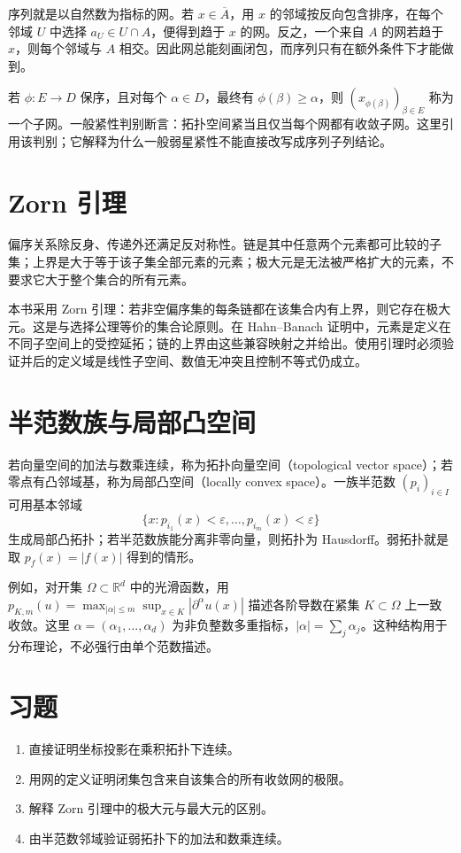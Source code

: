 \documentclass[UTF8,12pt,a4paper,fontset=fandol]{ctexbook}
\begin{document}
序列就是以自然数为指标的网。若 $x\in\overline A$，用 $x$ 的邻域按反向包含排序，在每个邻域 $U$ 中选择 $a_U\in U\cap A$，便得到趋于 $x$ 的网。反之，一个来自 $A$ 的网若趋于 $x$，则每个邻域与 $A$ 相交。因此网总能刻画闭包，而序列只有在额外条件下才能做到。

若 $\phi:E\to D$ 保序，且对每个 $\alpha\in D$，最终有 $\phi(\beta)\geq\alpha$，则 $(x_{\phi(\beta)})_{\beta\in E}$ 称为一个子网。一般紧性判别断言：拓扑空间紧当且仅当每个网都有收敛子网。这里引用该判别；它解释为什么一般弱星紧性不能直接改写成序列子列结论。

\section{Zorn 引理}
偏序关系除反身、传递外还满足反对称性。链是其中任意两个元素都可比较的子集；上界是大于等于该子集全部元素的元素；极大元是无法被严格扩大的元素，不要求它大于整个集合的所有元素。

本书采用 Zorn 引理：若非空偏序集的每条链都在该集合内有上界，则它存在极大元。这是与选择公理等价的集合论原则。在 Hahn--Banach 证明中，元素是定义在不同子空间上的受控延拓；链的上界由这些兼容映射之并给出。使用引理时必须验证并后的定义域是线性子空间、数值无冲突且控制不等式仍成立。

\section{半范数族与局部凸空间}
若向量空间的加法与数乘连续，称为拓扑向量空间（topological vector space）；若零点有凸邻域基，称为局部凸空间（locally convex space）。一族半范数 $(p_i)_{i\in I}$ 可用基本邻域
\[
 \{x:p_{i_1}(x)<\varepsilon,\ldots,p_{i_m}(x)<\varepsilon\}
\]
生成局部凸拓扑；若半范数族能分离非零向量，则拓扑为 Hausdorff。弱拓扑就是取 $p_f(x)=|f(x)|$ 得到的情形。

例如，对开集 $\Omega\subset\mathbb R^d$ 中的光滑函数，用 $p_{K,m}(u)=\max_{|\alpha|\leq m}\sup_{x\in K}|\partial^\alpha u(x)|$ 描述各阶导数在紧集 $K\subset\Omega$ 上一致收敛。这里 $\alpha=(\alpha_1,\ldots,\alpha_d)$ 为非负整数多重指标，$|\alpha|=\sum_j\alpha_j$。这种结构用于分布理论，不必强行由单个范数描述。

\section{习题}
\begin{enumerate}
 \item 直接证明坐标投影在乘积拓扑下连续。
 \item 用网的定义证明闭集包含来自该集合的所有收敛网的极限。
 \item 解释 Zorn 引理中的极大元与最大元的区别。
 \item 由半范数邻域验证弱拓扑下的加法和数乘连续。
\end{enumerate}
\end{document}
